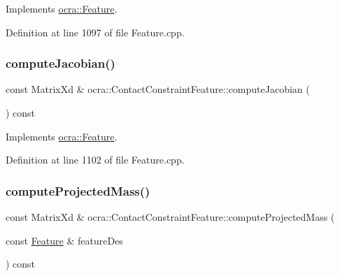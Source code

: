 Implements \hyperlink{classocra_1_1Feature_a4fb8eeeed978a1f727ec43cd1bd18d78}{ocra\+::\+Feature}.



Definition at line 1097 of file Feature.\+cpp.

\hypertarget{classocra_1_1ContactConstraintFeature_aa3c6131d9c4c815e9e9ec5ab50407b21}{}\label{classocra_1_1ContactConstraintFeature_aa3c6131d9c4c815e9e9ec5ab50407b21} 
\subsubsection{\texorpdfstring{compute\+Jacobian()}{computeJacobian()}\hspace{0.1cm}{\footnotesize\ttfamily [2/2]}}
{\footnotesize\ttfamily const Matrix\+Xd \& ocra\+::\+Contact\+Constraint\+Feature\+::compute\+Jacobian (\begin{DoxyParamCaption}{ }\end{DoxyParamCaption}) const\hspace{0.3cm}{\ttfamily [virtual]}}



Implements \hyperlink{classocra_1_1Feature_adbab3b388657555abb805bb971c2491f}{ocra\+::\+Feature}.



Definition at line 1102 of file Feature.\+cpp.

\hypertarget{classocra_1_1ContactConstraintFeature_ac4dec3a5defe2c50e6084d49a1838883}{}\label{classocra_1_1ContactConstraintFeature_ac4dec3a5defe2c50e6084d49a1838883} 
\subsubsection{\texorpdfstring{compute\+Projected\+Mass()}{computeProjectedMass()}\hspace{0.1cm}{\footnotesize\ttfamily [1/2]}}
{\footnotesize\ttfamily const Matrix\+Xd \& ocra\+::\+Contact\+Constraint\+Feature\+::compute\+Projected\+Mass (\begin{DoxyParamCaption}\item[{const \hyperlink{classocra_1_1Feature}{Feature} \&}]{feature\+Des }\end{DoxyParamCaption}) const\hspace{0.3cm}{\ttfamily [virtual]}}



